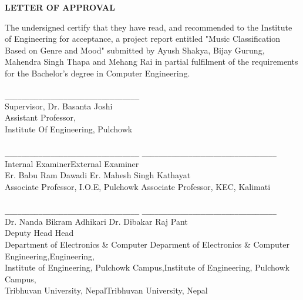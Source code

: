 	\newpage
	
    \vspace*{4\baselineskip}
    \begin{center}\textbf{LETTER OF APPROVAL}\end{center}
    \noindent The undersigned certify that they have read, and recommended to the Institute of Engineering for acceptance, a project report entitled "Music Classification Based on Genre and Mood" submitted by Ayush Shakya, Bijay Gurung, Mahendra Singh Thapa and Mehang Rai in partial fulfilment of the requirements for the Bachelor’s degree in Computer Engineering. \\\\
    \noindent
    \verb|________________________________|\\
    Supervisor, Dr. Basanta Joshi\\
    Assistant Professor,\\
    Institute Of Engineering, Pulchowk\\
    \vspace{4mm}
    \\
    \verb|________________________________| \hspace{10mm}\verb|________________________________|\\
    Internal Examiner\hspace{50mm}External Examiner\\
    Er. Babu Ram Dawadi\hspace{42mm} Er. Mahesh Singh Kathayat\\
    Associate Professor, I.O.E, Pulchowk \hspace{17mm}Associate Professor, KEC, Kalimati\\ 
    \vspace{4mm}
    \\
    \verb|________________________________| \hspace{10mm}\verb|________________________________|\\
    Dr. Nanda Bikram Adhikari \hspace{33mm}Dr. Dibakar Raj Pant\\
    Deputy Head \hspace{58mm}Head \\
    Department of Electronics \& Computer \hspace{13mm} Deparment of Electronics \& Computer\\ 
    Engineering,\hspace{60mm}Engineering,\\
    Institute of Engineering, Pulchowk Campus,\hspace{6mm}Institute of Engineering, Pulchowk Campus,\\
    Tribhuvan University, Nepal\hspace{33mm}Tribhuvan University, Nepal\\

